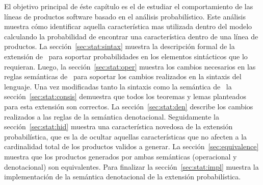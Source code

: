 El objetivo principal de éste capítulo es el de
estudiar el comportamiento de las líneas de productos
software basado en el análisis probabilístico.
Este análisis muestra cómo identificar aquella
característica mas utilizada dentro del modelo 
calculando la probabilidad de encontrar
una característica dentro de una línea de productos.
%
La sección~\ref{sec:stat:sintax} muestra la descripción
formal de la extensión de \fodaPA\ para soportar
probabilidades en los elementos sintácticos que lo
requieran.
%
Luego, la sección~\ref{sec:stat:oper} muestra los
cambios necesarios en las reglas semánticas de \fodaPA\
para soportar los cambios realizados en la sintaxis
del lenguaje.
%
Una vez modificadas tanto la sintaxis como la semántica 
de \fodaPA\ la sección~\ref{sec:stat:consis} demuestra
que todos los teoremas y lemas planteados para esta extensión
son correctos.
%
La sección~\ref{sec:stat:den} describe los cambios realizados a las
reglas de la semántica denotacional.
%
Seguidamente la sección~\ref{sec:stat:hid} muestra una
característica novedosa de la extensión probabilística, que
es la de ocultar aquellas características que no afecten 
a la cardinalidad total de los productos validos a generar.
%
La sección~\ref{sec:equivalence} muestra que los productos
generados por ambas semánticas (operacional y denotacional)
son equivalentes.
%
Para finalizar la sección~\ref{sec:stat:impl} muestra la
implementación de la semántica denotacional de la extensión
probabilística.



